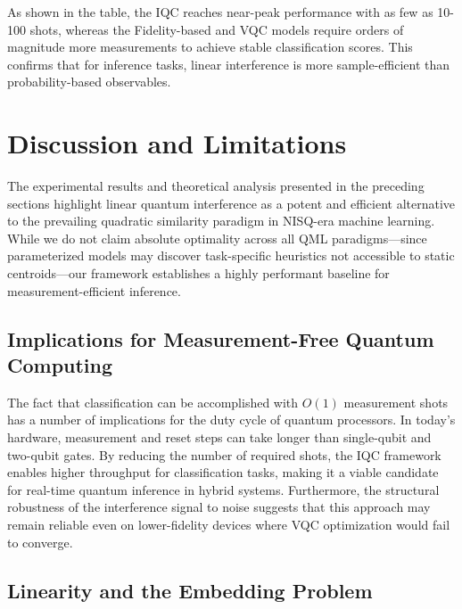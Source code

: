 \documentclass[conference]{IEEEtran}
\begin{document}
As shown in the table, the IQC reaches near-peak performance with as few as 10-100 shots, whereas the Fidelity-based and VQC models require orders of magnitude more measurements to achieve stable classification scores. This confirms that for inference tasks, linear interference is more sample-efficient than probability-based observables.

\section{Discussion and Limitations}

The experimental results and theoretical analysis presented in the preceding sections highlight linear quantum interference as a potent and efficient alternative to the prevailing quadratic similarity paradigm in NISQ-era machine learning. While we do not claim absolute optimality across all QML paradigms—since parameterized models may discover task-specific heuristics not accessible to static centroids—our framework establishes a highly performant baseline for measurement-efficient inference.

\subsection{Implications for Measurement-Free Quantum Computing}

The fact that classification can be accomplished with $O(1)$ measurement shots has a number of implications for the duty cycle of quantum processors. In today’s hardware, measurement and reset steps can take longer than single-qubit and two-qubit gates. By reducing the number of required shots, the IQC framework enables higher throughput for classification tasks, making it a viable candidate for real-time quantum inference in hybrid systems. Furthermore, the structural robustness of the interference signal to noise suggests that this approach may remain reliable even on lower-fidelity devices where VQC optimization would fail to converge.

\subsection{Linearity and the Embedding Problem}
\end{document}

